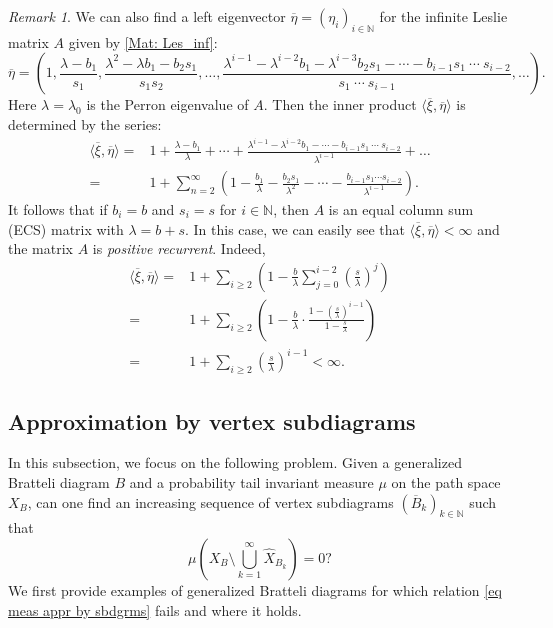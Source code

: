 \documentclass[11pt,reqno]{amsart}
\theoremstyle{definition}
\theoremstyle{remark}
\newtheorem{remark}[definition]{Remark}
\theoremstyle{plain}
\def\ol{\overline}
\def\wh{\widehat}
\newcommand{\N}{\mathbb N}
\newcommand{\be}{\begin{equation}}
\newcommand{\ee}{\end{equation}}
\newcommand{\ba}{\begin{aligned}}
\newcommand{\ea}{\end{aligned}}
\numberwithin{equation}{section}
\begin{document}
\begin{remark}
We can also find a left eigenvector $\ol\eta = (\eta_i)_{i \in \N}$ for the infinite Leslie matrix $A$ given by \eqref{Mat: Les_inf}:
$$
\ol\eta = \left(1, \frac{\lambda - b_1}{s_1}, \frac{\lambda^2 - 
\lambda b_1 - b_2s_1}{s_1s_2}, \ldots, \frac{\lambda^{i-1} - \lambda^{i-2}b_1 - \lambda^{i-3}b_2s_1 - \cdots - b_{i-1}s_1\ \cdots \ s_{i-2}} {s_1\ \cdots\ s_{i-1}}, \ldots\right).
$$ Here $\lambda = \lambda_0$ is the Perron eigenvalue of $A$. Then the inner product $\langle \ol\xi, \ol \eta\rangle$ is determined by the series: 
$$
\ba 
\langle \ol\xi, \ol \eta\rangle = & 1 + \frac{\lambda - b_1}{\lambda} + \cdots + \frac{\lambda^{i-1} - \lambda^{i-2}b_1  - \cdots - b_{i-1}s_1\ \cdots \ s_{i-2}}{\lambda^{i-1}} + \ldots \\
= & 1 + \sum_{n=2}^{\infty} \left(1 - \frac{b_1}{\lambda} - \frac{b_2s_1}{\lambda^2} - \cdots - \frac{b_{i-1}s_1 \cdots s_{i-2}}{\lambda^{i-1}}\right). 
\ea
$$
It follows that if $b_i = b$ and $s_i =s$ for $i \in \N$, then 
$A$ is an equal column sum (ECS) matrix with $\lambda = b+s$. In this case, we can easily see that 
$\langle \ol\xi, \ol \eta\rangle < \infty$ and the matrix $A$ is \textit{positive recurrent}. Indeed,
$$
\ba
\langle \ol\xi, \ol \eta\rangle = & 1 + \sum_{i\geq 2} \left(1 - 
\frac{b}{\lambda} \sum_{j=0}^{i-2} (\frac{s}{\lambda})^j \right)\\
= &  1 + \sum_{i\geq 2} \left(1 - \frac{b}{\lambda} \cdot 
\frac{1- (\frac{s}{\lambda})^{i-1}}{1 - \frac{s}{\lambda}}\right)\\
= & 1 + \sum_{i\geq 2}\left(\frac{s}{\lambda}\right)^{i-1} < \infty. 
\ea
$$
\end{remark}

\subsection{Approximation by vertex subdiagrams} 
In this subsection, we focus on the following problem. 
Given a generalized Bratteli diagram $B$ and a probability tail
invariant measure $\mu$ on the path space $X_B$, can one find an
increasing sequence of vertex subdiagrams $(\ol B_k)_{k \in \N}$ such that
\be\label{eq meas appr by sbdgrms}
\mu \left(X_B \setminus \bigcup_{k=1}^{\infty} \wh X_{B_k}\right) = 0?
\ee
We first provide examples of generalized Bratteli diagrams for which relation \eqref{eq meas appr by sbdgrms} fails and where it holds.
\end{document}
